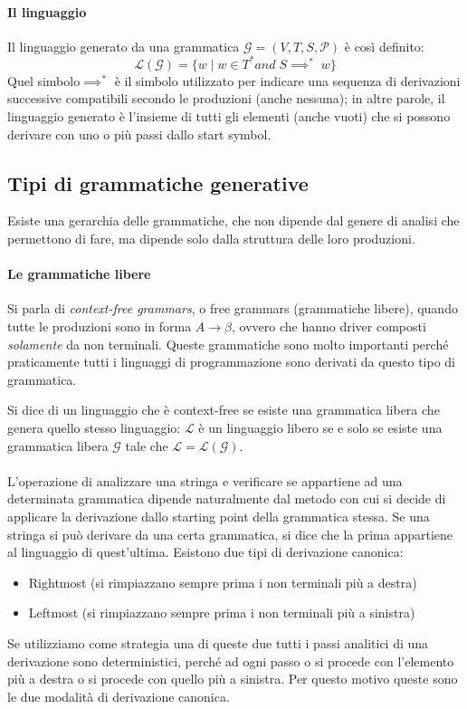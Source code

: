 \documentclass[class=book, crop=false, oneside, 12pt]{standalone}
\begin{document}
\paragraph{Il linguaggio}
Il linguaggio generato da una grammatica \(\mathcal{G} = (V,T,S,\mathcal{P})\) è così definito:
\begin{equation}
    \mathcal{L}(\mathcal{G}) = \{w \mid w \in T^* and \; S \implies^*\;  w\}
\end{equation}
Quel simbolo\( \implies^*\) è il simbolo utilizzato per indicare una sequenza di derivazioni successive compatibili secondo le produzioni (anche nessuna); in altre parole, il linguaggio generato è l'insieme di tutti gli elementi (anche vuoti) che si possono derivare con uno o più passi dallo start symbol. 

\subsection{Tipi di grammatiche generative}
Esiste una gerarchia delle grammatiche, che non dipende dal genere di analisi che permettono di fare, ma dipende solo dalla struttura delle loro produzioni.

\paragraph{Le grammatiche libere}
Si parla di \emph{context-free grammars}, o free grammars (grammatiche libere), quando tutte le produzioni sono in forma \(A \to \beta\), ovvero che hanno driver composti \emph{solamente} da non terminali. Queste grammatiche sono molto importanti perché praticamente tutti i linguaggi di programmazione sono derivati da questo tipo di grammatica.

Si dice di un linguaggio che è context-free se esiste una grammatica libera che genera quello stesso linguaggio: \(\mathcal{L}\) è un linguaggio libero se e solo se esiste una grammatica libera \(\mathcal{G}\) tale che \(\mathcal{L}=\mathcal{L}(\mathcal{G})\).

\paragraph{}
L’operazione di analizzare una stringa e verificare se appartiene ad una determinata grammatica dipende naturalmente dal metodo con cui si decide di applicare la derivazione dallo starting point della grammatica stessa. Se una stringa si può derivare da una certa grammatica, si dice che la prima appartiene al linguaggio di quest'ultima.
Esistono due tipi di derivazione canonica:
\begin{itemize}
    \item Rightmost (si rimpiazzano sempre prima i non terminali più a destra)
    \item Leftmost (si rimpiazzano sempre prima i non terminali più a sinistra)
\end{itemize}
Se utilizziamo come strategia una di queste due tutti i passi analitici di una derivazione sono deterministici, perché ad ogni passo o si procede con l’elemento più a destra o si procede con quello più a sinistra. Per questo motivo queste sono le due modalità di derivazione canonica.
\end{document}
